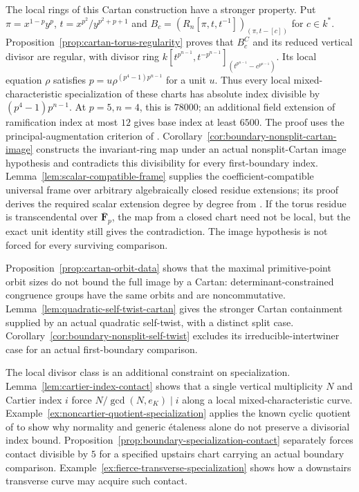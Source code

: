 The local rings of this Cartan construction have a stronger property. Put $\pi=x^{1-p}y^p$, $t=x^{p^2}/y^{p^2+p+1}$ and $B_c=(R_n[\pi,t,t^{-1}])_{(\pi,t-[c])}$ for $c\in k^*$. Proposition~\ref{prop:cartan-torus-regularity} proves that $B_c^C$ and its reduced vertical divisor are regular, with divisor ring $k[t^{p^{n-1}},t^{-p^{n-1}}]_{(t^{p^{n-1}}-c^{p^{n-1}})}$. Its local equation $\rho$ satisfies $p=u\rho^{(p^4-1)p^{n-1}}$ for a unit $u$. Thus every local mixed-characteristic specialization of these charts has absolute index divisible by $(p^4-1)p^{n-1}$. At $p=5,n=4$, this is $78000$; an additional field extension of ramification index at most $12$ gives base index at least $6500$. The proof uses the principal-augmentation criterion of \citet[Theorem~2 and Proposition~5, pp.~64--69]{KiralyLutkebohmert2013}. Corollary~\ref{cor:boundary-nonsplit-cartan-image} constructs the invariant-ring map under an actual nonsplit-Cartan image hypothesis and contradicts this divisibility for every first-boundary index. Lemma~\ref{lem:scalar-compatible-frame} supplies the coefficient-compatible universal frame over arbitrary algebraically closed residue extensions; its proof derives the required scalar extension degree by degree from \citet[Propositions~4.1--4.3, pp.~570--573]{Drinfeld1974}. If the torus residue is transcendental over $\overline{\mathbf F}_p$, the map from a closed chart need not be local, but the exact unit identity still gives the contradiction. The image hypothesis is not forced for every surviving comparison.

Proposition~\ref{prop:cartan-orbit-data} shows that the maximal primitive-point orbit sizes do not bound the full image by a Cartan: determinant-constrained congruence groups have the same orbits and are noncommutative. Lemma~\ref{lem:quadratic-self-twist-cartan} gives the stronger Cartan containment supplied by an actual quadratic self-twist, with a distinct split case. Corollary~\ref{cor:boundary-nonsplit-self-twist} excludes its irreducible-intertwiner case for an actual first-boundary comparison.

The local divisor class is an additional constraint on specialization. Lemma~\ref{lem:cartier-index-contact} shows that a single vertical multiplicity $N$ and Cartier index $i$ force $N/\gcd(N,e_K)\mid i$ along a local mixed-characteristic curve. Example~\ref{ex:noncartier-quotient-specialization} applies the known cyclic quotient of \citet[Example~5.10]{LiedtkeMatsumoto2018} to show why normality and generic \'etaleness alone do not preserve a divisorial index bound. Proposition~\ref{prop:boundary-specialization-contact} separately forces contact divisible by $5$ for a specified upstairs chart carrying an actual boundary comparison. Example~\ref{ex:fierce-transverse-specialization} shows how a downstairs transverse curve may acquire such contact.

